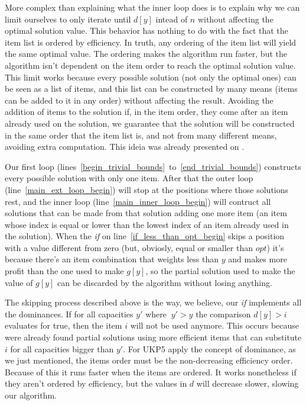 \documentclass[12pt]{article}
\begin{document}
More complex than explaining what the inner loop does is to explain why we can limit ourselves to only iterate until \(d[y]\) intead of \(n\) without affecting the optimal solution value. This behavior has nothing to do with the fact that the item list is ordered by efficiency. In truth, any ordering of the item list will yield the same optimal value. The ordering makes the algorithm run faster, but the algorithm isn't dependent on the item order to reach the optimal solution value. This limit works because every possible solution (not only the optimal ones) can be seen as a list of items, and this list can be constructed by many means (items can be added to it in any order) without affecting the result. Avoiding the addition of items to the solution if, in the item order, they come after an item already used on the solution, we guarantee that the solution will be constructed in the same order that the item list is, and not from many different means, avoiding extra computation. This ideia was already presented on \cite{garfinkel}.

Our first loop (lines~\ref{begin_trivial_bounds}~to~\ref{end_trivial_bounds}) constructs every possible solution with only one item. After that the outer loop (line~\ref{main_ext_loop_begin}) will stop at the positions where those solutions rest, and the inner loop (line~\ref{main_inner_loop_begin}) will contruct all solutions that can be made from that solution adding one more item (an item whose index is equal or lower than the lowest index of an item already used in the solution). When the \textit{if} on line~\ref{if_less_than_opt_begin} skips a position with a value different from zero (but, obviosly, equal or smaller than \(opt\)) it's because there's an item combination that weights less than \(y\) and makes more profit than the one used to make \(g[y]\), so the partial solution used to make the value of \(g[y]\) can be discarded by the algorithm without losing anything.

The skipping process described above is the way, we believe, our \textit{if} implements all the dominances. If for all capacities \(y'\) where \(~y' > y\) the comparison \(d[y] > i\) evaluates for true, then the item \(i\) will not be used anymore. This occurs because were already found partial solutions using more efficient items that can substitute \(i\) for all capacities bigger than \(y'\). For UKP5 apply the concept of dominance, as we just mentioned, the items order must be the non-decreasing efficiency order. Because of this it runs faster when the items are ordered. It works nonetheless if they aren't ordered by efficiency, but the values in \(d\) will decrease slower, slowing our algorithm.
\end{document}
